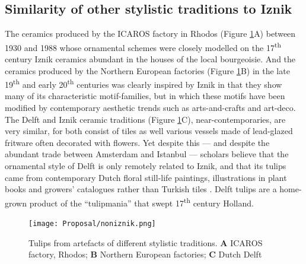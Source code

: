 \documentclass[11pt]{article}
\begin{document}
\subsection{Similarity of other stylistic traditions to Iznik}
The ceramics produced by the ICAROS factory in Rhodos (Figure \ref{fig:noniznik}A) between 1930 and 1988 whose ornamental schemes were closely modelled on the 17\textsuperscript{th} century Iznik ceramics abundant in the houses of the local bourgeoisie. And the ceramics produced by the Northern European factories (Figure \ref{fig:noniznik}B) in the late 19\textsuperscript{th} and early 20\textsuperscript{th} centuries was clearly inspired by Iznik in that they show many of its characteristic motif-families, but in which these motifs have been modified by contemporary aesthetic trends such as arts-and-crafts and art-deco. The Delft and Iznik ceramic traditions (Figure \ref{fig:noniznik}C), near-contemporaries, are very similar, for both consist of tiles as well various vessels made of lead-glazed fritware often decorated with flowers. Yet despite this --- and despite the abundant trade between Amsterdam and Istanbul --- scholars believe that the ornamental style of Delft is only remotely related to Iznik, and that its tulips came from contemporary Dutch floral still-life paintings, illustrations in plant books and growers' catalogues rather than Turkish tiles \parencite{Schaap1994}. Delft tulips are a home-grown product of the ``tulipmania'' that swept 17\textsuperscript{th} century Holland.\par

\begin{figure}[H]
\centering
\texttt{[image: Proposal/noniznik.png]}
\caption{Tulips from artefacts of different stylistic traditions. \textbf{A} ICAROS factory, Rhodos; \textbf{B} Northern European factories; \textbf{C} Dutch Delft}
\label{fig:noniznik}
\end{figure}
\end{document}
